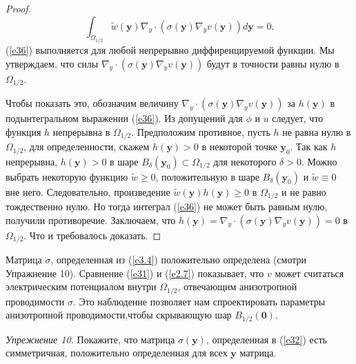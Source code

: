 \documentclass[a4paper, 12pt]{article}
\begin{document}
\begin{proof}
\begin{equation}\label{e36}
\int_{\Omega_{1/2}}{\tilde{w}(\textbf{y})\nabla_y \cdot (\sigma(\textbf{y})\nabla_y v(\textbf{y})) d\textbf{y}} =0.
\end{equation}
(\ref{e36}) выполняется для любой непрерывно диффиренцируемой функции. Мы утверждаем, что силы 
$\nabla_y \cdot (\sigma(\textbf{y})\nabla_y v(\textbf{y}))$ будут в точности равны нулю в $\Omega_{1/2}$.


Чтобы показать это, обозначим величину $\nabla_y \cdot (\sigma(\textbf{y})\nabla_y v(\textbf{y}))$ за
$h(\textbf{y})$ в подынтегральном выражении (\ref{e36}). Из допущений для $\phi$ и $u$ следует, что функция $h$ непрерывна в $\Omega_{1/2}$.
Предположим противное, пусть $h$ не равна нулю в $\Omega_{1/2}$, для определенности, скажем $h(\textbf{y})>0$ в некоторой точке $\textbf{y}_0$. Так как $h$ непрерывна, $h(\textbf{y})>0$ в шаре $B_{\delta}(\textbf{y}_0) \subset \Omega_{1/2}$ для некоторого $\delta > 0$.
Можно выбрать некоторую функцию $\tilde{w} \geq 0$, положительную в шаре $B_{\delta}(\textbf{y}_0)$ и 
$\tilde{w} \equiv 0$ вне него. Следовательно, произведение $\tilde{w}(\textbf{y})h(\textbf{y}) \geq 0$ в $\Omega_{1/2}$ и не равно тождественно нулю. Но тогда интеграл (\ref{e36}) не может быть равным нулю, получили противоречие. Заключаем, что $h(\textbf{y}) = \nabla_y \cdot (\sigma(\textbf{y})\nabla_y v(\textbf{y})) = 0$ в $\Omega_{1/2}$. Что и требовалось доказать.
\end{proof}
Матрица $\sigma$, определенная из (\ref{e3.4}) положительно определена (смотри Упражнение 10).
Сравнение (\ref{e31}) и (\ref{e2.7}) показывает, что $v$ может считаться электрическим потенциалом внутри $\Omega_{1/2}$, отвечающим анизотропной проводимости $\sigma$. Это наблюдение позволяет нам спроектировать параметры анизотропной проводимости,чтобы скрывающую шар $B_{1/2}(\textbf{0})$.

\textit{Упрежнение 10.} Покажите, что матрица $\sigma(\textbf{y})$, определенная в (\ref{e32}) есть симметричная, положительно определенная для всех $\textbf{y}$ матрица.   
\end{document}
